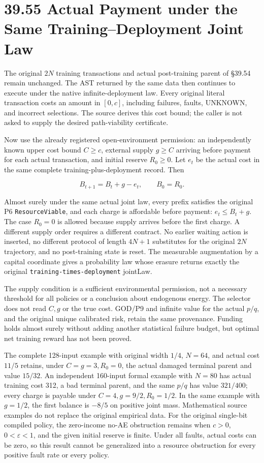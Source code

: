 \documentclass[
  english,
  11pt,
  oneside]{book}
\begin{document}
\section{39.55 Actual Payment under the Same Training--Deployment Joint Law}\label{actual-payment-under-the-same-trainingdeployment-joint-law}

The original \(2N\) training transactions and actual post-training parent of §39.54 remain unchanged. The AST returned by the same data then continues to execute under the native infinite-deployment law. Every original literal transaction costs an amount in \([0,c]\), including failures, faults, UNKNOWN, and incorrect selections. The source derives this cost bound; the caller is not asked to supply the desired path-viability certificate.

Now use the already registered open-environment permission: an independently known upper cost bound \(C\ge c\), external supply \(g\ge C\) arriving before payment for each actual transaction, and initial reserve \(R_0\ge0\). Let \(e_t\) be the actual cost in the same complete training-plus-deployment record. Then

\[B_{t+1}=B_t+g-e_t,\qquad B_0=R_0.\]

Almost surely under the same actual joint law, every prefix satisfies the original P6 \nolinkurl{ResourceViable}, and each charge is affordable before payment: \(e_t\le B_t+g\). The case \(R_0=0\) is allowed because supply arrives before the first charge. A different supply order requires a different contract. No earlier waiting action is inserted, no different protocol of length \(4N+1\) substitutes for the original \(2N\) trajectory, and no post-training state is reset. The measurable augmentation by a capital coordinate gives a probability law whose erasure returns exactly the original \nolinkurl{training-times-deployment} jointLaw.

The supply condition is a sufficient environmental permission, not a necessary threshold for all policies or a conclusion about endogenous energy. The selector does not read \(C,g\) or the true cost. GOD/P9 and infinite value for the actual \(p/q\), and the original unique calibrated risk, retain the same provenance. Funding holds almost surely without adding another statistical failure budget, but optimal net training reward has not been proved.

The complete 128-input example with original width \(1/4\), \(N=64\), and actual cost \(11/5\) retains, under \(C=g=3,R_0=0\), the actual damaged terminal parent and value \(15/32\). An independent 160-input formal example with \(N=80\) has actual training cost 312, a bad terminal parent, and the same \(p/q\) has value \(321/400\); every charge is payable under \(C=4,g=9/2,R_0=1/2\). In the same example with \(g=1/2\), the first balance is \(-8/5\) on positive joint mass. Mathematical source examples do not replace the original empirical data. For the original single-bit compiled policy, the zero-income no-AE obstruction remains when \(c>0\), \(0<\varepsilon<1\), and the given initial reserve is finite. Under all faults, actual costs can be zero, so this result cannot be generalized into a resource obstruction for every positive fault rate or every policy.
\end{document}
